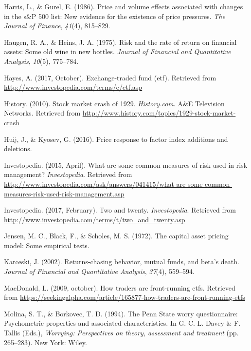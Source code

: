 \documentclass[12pt,twoside]{reedthesis}
\theoremstyle{definition}
\theoremstyle{definition}
\theoremstyle{definition}
\theoremstyle{remark}
\begin{document}
\hypertarget{ref-harris1986}{}
Harris, L., \& Gurel, E. (1986). Price and volume effects associated
with changes in the s\&P 500 list: New evidence for the existence of
price pressures. \emph{The Journal of Finance}, \emph{41}(4), 815--829.

\hypertarget{ref-haugen1975}{}
Haugen, R. A., \& Heins, J. A. (1975). Risk and the rate of return on
financial assets: Some old wine in new bottles. \emph{Journal of
Financial and Quantitative Analysis}, \emph{10}(5), 775--784.

\hypertarget{ref-hayes2017}{}
Hayes, A. (2017, October). Exchange-traded fund (etf). Retrieved from
\url{http://www.investopedia.com/terms/e/etf.asp}

\hypertarget{ref-history2010}{}
History. (2010). Stock market crash of 1929. \emph{History.com}. A\&E
Television Networks. Retrieved from
\url{http://www.history.com/topics/1929-stock-market-crash}

\hypertarget{ref-huij2016}{}
Huij, J., \& Kyosev, G. (2016). Price response to factor index additions
and deletions.

\hypertarget{ref-investopedia2015}{}
Investopedia. (2015, April). What are some common measures of risk used
in risk management? \emph{Investopedia}. Retrieved from
\url{http://www.investopedia.com/ask/answers/041415/what-are-some-common-measures-risk-used-risk-management.asp}

\hypertarget{ref-investopedia2017}{}
Investopedia. (2017, February). Two and twenty. \emph{Investopedia}.
Retrieved from
\url{http://www.investopedia.com/terms/t/two_and_twenty.asp}

\hypertarget{ref-jensen1972}{}
Jensen, M. C., Black, F., \& Scholes, M. S. (1972). The capital asset
pricing model: Some empirical tests.

\hypertarget{ref-karceski2002}{}
Karceski, J. (2002). Returns-chasing behavior, mutual funds, and beta's
death. \emph{Journal of Financial and Quantitative Analysis},
\emph{37}(4), 559--594.

\hypertarget{ref-macdonald2009}{}
MacDonald, L. (2009, october). How traders are front-running etfs.
Retrieved from
\url{https://seekingalpha.com/article/165877-how-traders-are-front-running-etfs}

\hypertarget{ref-Molina1994}{}
Molina, S. T., \& Borkovec, T. D. (1994). The Penn State worry
questionnaire: Psychometric properties and associated characteristics.
In G. C. L. Davey \& F. Tallis (Eds.), \emph{Worrying: Perspectives on
theory, assessment and treatment} (pp. 265--283). New York: Wiley.
\end{document}
